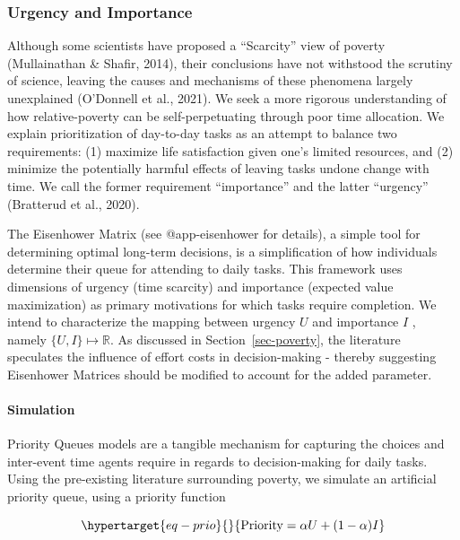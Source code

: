 \hypertarget{urgency-and-importance}{%
\subsubsection{Urgency and Importance}\label{urgency-and-importance}}

Although some scientists have proposed a ``Scarcity'' view of poverty
(Mullainathan \& Shafir, 2014), their conclusions have not withstood the
scrutiny of science, leaving the causes and mechanisms of these
phenomena largely unexplained (O'Donnell et al., 2021). We seek a more
rigorous understanding of how relative-poverty can be self-perpetuating
through poor time allocation. We explain prioritization of day-to-day
tasks as an attempt to balance two requirements: (1) maximize life
satisfaction given one's limited resources, and (2) minimize the
potentially harmful effects of leaving tasks undone change with time. We
call the former requirement ``importance'' and the latter ``urgency''
(Bratterud et al., 2020).

The Eisenhower Matrix (see @app-eisenhower for details), a simple tool
for determining optimal long-term decisions, is a simplification of how
individuals determine their queue for attending to daily tasks. This
framework uses dimensions of urgency (time scarcity) and importance
(expected value maximization) as primary motivations for which tasks
require completion. We intend to characterize the mapping between
urgency \(U\) and importance \(I\) , namely
\(\{ U,I \} \mapsto \mathbb{R}\). As discussed in
Section~\ref{sec-poverty}, the literature speculates the influence of
effort costs in decision-making - thereby suggesting Eisenhower Matrices
should be modified to account for the added parameter.

\hypertarget{simulation}{%
\paragraph{Simulation}\label{simulation}}

Priority Queues models are a tangible mechanism for capturing the
choices and inter-event time agents require in regards to
decision-making for daily tasks. Using the pre-existing literature
surrounding poverty, we simulate an artificial priority queue, using a
priority function

\begin{equation}\protect\hypertarget{eq-prio}{}{
\text{Priority} = \alpha U + (1- \alpha) I
}\label{eq-prio}\end{equation}


